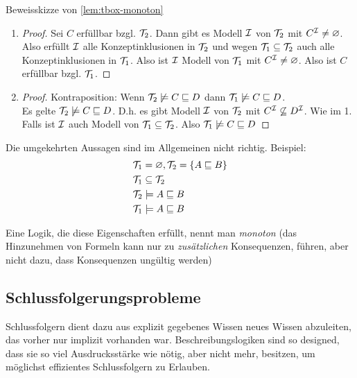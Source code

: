 \begin{tafel}[Beweisskizze]Beweisskizze von \autoref{lem:tbox-monoton}
\begin{enumerate}
  \item \begin{proof}
      Sei $C$ erfüllbar bzgl. $\mathcal{T}_{2}$.
  Dann gibt es Modell $\mathcal{I}$ von $\mathcal{T}_{2}$ mit $C^{\mathcal{I}} \neq \varnothing$.
  Also erfüllt $\mathcal{I}$ alle Konzeptinklusionen in $\mathcal{T}_{2}$ und wegen $\mathcal{T}_{1} \subseteq \mathcal{T}_{2}$ auch alle Konzeptinklusionen in $\mathcal{T}_{1}$.
  Also ist $\mathcal{I}$ Modell von $\mathcal{T}_1$ mit $C^{\mathcal{I}} \neq \varnothing$.
  Also ist $C$ erfüllbar bzgl. $\mathcal{T}_1$.
  \end{proof}
  \item \begin{proof}
    Kontraposition: Wenn $\mathcal{T}_2 \not\models C \sqsubseteq D$ dann $\mathcal{T}_1 \not\models C \sqsubseteq D$. \\
  Es gelte $\mathcal{T}_2 \not\models C \sqsubseteq D$.
  D.h. es gibt Modell $\mathcal{I}$ von $\mathcal{T}_2$ mit $C^{\mathcal{I}} \not\subseteq D^{\mathcal{I}}$.
  Wie im 1. Falls ist $\mathcal{I}$ auch Modell von $\mathcal{T}_1 \subseteq \mathcal{T}_2$.
  Also $\mathcal{T}_1 \not\models C \sqsubseteq D$
  \end{proof}
\end{enumerate}

Die umgekehrten Aussagen sind im Allgemeinen nicht richtig. Beispiel:
\begin{align*}
    &\mathcal{T}_1 = \varnothing, \mathcal{T}_2 = \{A \sqsubseteq B\}\\
    &\mathcal{T}_1 \subseteq \mathcal{T}_2 \\
    &\mathcal{T}_2 \models A \sqsubseteq B\\
    &\mathcal{T}_1 \models A \sqsubseteq B
\end{align*}
\end{tafel}

Eine Logik, die diese Eigenschaften erfüllt, nennt man \emph{monoton} (das Hinzunehmen von Formeln kann nur zu \emph{zusätzlichen} Konsequenzen, führen, aber nicht dazu, dass Konsequenzen ungültig werden)

\subsection{Schlussfolgerungsprobleme}\label{schlussfolgerungsprobleme}

Schlussfolgern dient dazu aus explizit gegebenes Wissen neues Wissen abzuleiten, das vorher nur implizit vorhanden war. Beschreibungslogiken sind so designed, dass sie so viel Ausdrucksstärke wie nötig, aber nicht mehr, besitzen, um möglichst effizientes Schlussfolgern zu Erlauben.

